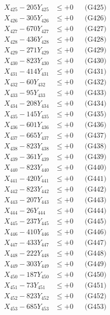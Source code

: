 \documentclass[a4paper,10pt]{article}
\begin{document}
{\begin{align}
X_{425} - 205Y_{425} &\leq +0 && \text{(G425)} \\
X_{426} - 305Y_{426} &\leq +0 && \text{(G426)} \\
X_{427} - 670Y_{427} &\leq +0 && \text{(G427)} \\
X_{428} - 436Y_{428} &\leq +0 && \text{(G428)} \\
X_{429} - 271Y_{429} &\leq +0 && \text{(G429)} \\
X_{430} - 823Y_{430} &\leq +0 && \text{(G430)} \\
\allowbreak
X_{431} - 414Y_{431} &\leq +0 && \text{(G431)} \\
X_{432} - 60Y_{432} &\leq +0 && \text{(G432)} \\
X_{433} - 95Y_{433} &\leq +0 && \text{(G433)} \\
X_{434} - 208Y_{434} &\leq +0 && \text{(G434)} \\
X_{435} - 145Y_{435} &\leq +0 && \text{(G435)} \\
X_{436} - 601Y_{436} &\leq +0 && \text{(G436)} \\
X_{437} - 665Y_{437} &\leq +0 && \text{(G437)} \\
X_{438} - 823Y_{438} &\leq +0 && \text{(G438)} \\
X_{439} - 361Y_{439} &\leq +0 && \text{(G439)} \\
X_{440} - 823Y_{440} &\leq +0 && \text{(G440)} \\
\allowbreak
X_{441} - 420Y_{441} &\leq +0 && \text{(G441)} \\
X_{442} - 823Y_{442} &\leq +0 && \text{(G442)} \\
X_{443} - 207Y_{443} &\leq +0 && \text{(G443)} \\
X_{444} - 26Y_{444} &\leq +0 && \text{(G444)} \\
X_{445} - 237Y_{445} &\leq +0 && \text{(G445)} \\
X_{446} - 410Y_{446} &\leq +0 && \text{(G446)} \\
X_{447} - 433Y_{447} &\leq +0 && \text{(G447)} \\
X_{448} - 222Y_{448} &\leq +0 && \text{(G448)} \\
X_{449} - 303Y_{449} &\leq +0 && \text{(G449)} \\
X_{450} - 187Y_{450} &\leq +0 && \text{(G450)} \\
\allowbreak
X_{451} - 73Y_{451} &\leq +0 && \text{(G451)} \\
X_{452} - 823Y_{452} &\leq +0 && \text{(G452)} \\
X_{453} - 685Y_{453} &\leq +0 && \text{(G453)} \\

\end{align}}
\end{document}
